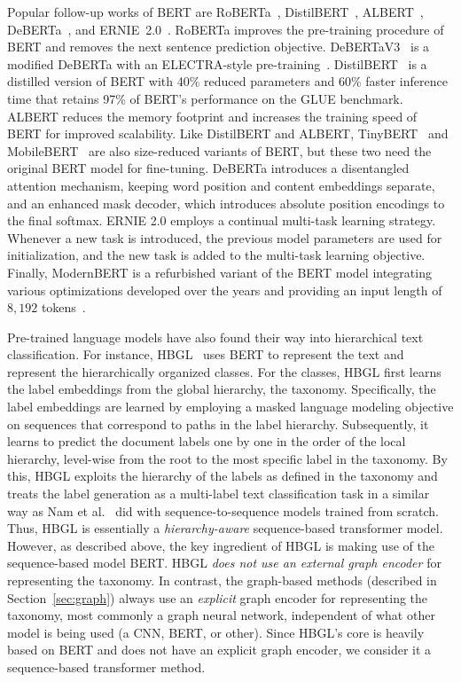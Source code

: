 Popular follow-up works of BERT are
RoBERTa~\cite{liu_roberta:_2019}, DistilBERT~\cite{distilbert}, ALBERT~\cite{lan_albert_2020}, DeBERTa~\cite{he_deberta_2021}, and
ERNIE~2.0~\cite{sun_ernie_2019}.
RoBERTa improves the pre-training procedure of BERT and removes the next sentence prediction objective.
DeBERTaV3~\cite{DBLP:conf/iclr/HeGC23} is a modified DeBERTa with an ELECTRA-style pre-training~\cite{DBLP:conf/iclr/ClarkLLM20-electra}.
DistilBERT~\cite{distilbert} is a distilled version of BERT with 40\% reduced parameters and 60\% faster inference time that retains 97\% of BERT's performance on the GLUE benchmark.
ALBERT reduces the memory footprint and increases the training speed of BERT for improved scalability.
Like DistilBERT and ALBERT, TinyBERT~\cite{tinybert} and MobileBERT~\cite{sun2020mobilebert} are also size-reduced variants of BERT, but these two need the original BERT model for fine-tuning.
DeBERTa introduces a disentangled attention mechanism, \ie keeping word position and content embeddings separate, and an enhanced mask decoder, which introduces absolute position encodings to the final softmax.
ERNIE 2.0 employs a continual multi-task learning strategy. 
Whenever a new task is introduced, the previous model parameters are used for initialization, and the new task is added to the multi-task learning objective.
Finally, ModernBERT is a refurbished variant of the BERT model integrating various optimizations developed over the years and providing an input length of $8,192$ tokens~\cite{warner2024smarterbetterfasterlonger}.

Pre-trained language models have also found their way into hierarchical text classification.
For instance, HBGL~\cite{hbgl} uses BERT to represent the text and represent the hierarchically organized classes.
For the classes, HBGL first learns the label embeddings from the global hierarchy, \ie the taxonomy.
Specifically, the label embeddings are learned by employing a masked language modeling objective on sequences that correspond to paths in the label hierarchy.
Subsequently, it learns to predict the document labels one by one in the order of the local hierarchy, \ie level-wise from the root to the most specific label in the taxonomy.
By this, HBGL exploits the hierarchy of the labels as defined in the taxonomy and treats the label generation as a multi-label text classification task in a similar way as Nam et al.~ \cite{namMaximizingSubsetAccuracy2017} did with sequence-to-sequence models trained from scratch.
Thus, HBGL is essentially a \textit{hierarchy-aware} sequence-based transformer model. 
However, as described above, the key ingredient of HBGL is making use of the sequence-based model BERT.
HBGL \textit{does not use an external graph encoder} for representing the taxonomy.
In contrast, the graph-based methods (described in Section~\ref{sec:graph}) always use an \textit{explicit} graph encoder for representing the taxonomy, most commonly a graph neural network, independent of what other model is being used (\eg a CNN, BERT, or other).
Since HBGL's core is heavily based on BERT and does not have an explicit graph encoder, we consider it a sequence-based transformer method.

